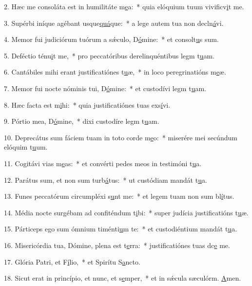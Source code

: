 2. Hæc me consoláta est in humilitáte m\uline{e}a:~* quia elóquium tuum vivificv\uline{i}t me.\par 
3. Supérbi iníque agébant usque\uline{quá}que:~* a lege autem tua non decln\uline{á}vi.\par 
4. Memor fui judiciórum tuórum a sǽculo, D\uline{ó}mine:~* et consolt\uline{u}s sum.\par 
5. Deféctio ténu\uline{i}t me,~* pro peccatóribus derelinquéntibus legm t\uline{u}am.\par 
6. Cantábiles mihi erant justificatiónes t\uline{u}æ,~* in loco peregrinatións m\uline{e}æ.\par 
7. Memor fui nocte nóminis tui, D\uline{ó}mine:~* et custodívi legm t\uline{u}am.\par 
8. Hæc facta est m\uline{i}hi:~* quia justificatiónes tuas exs\uline{í}vi.\par 
9. Pórtio mea, D\uline{ó}mine,~* dixi custodíre legm t\uline{u}am.\par 
10. Deprecátus sum fáciem tuam in toto corde m\uline{e}o:~* miserére mei secúndum elóquim t\uline{u}um.\par 
11. Cogitávi vias m\uline{e}as:~* et convérti pedes meos in testimóni t\uline{u}a.\par 
12. Parátus sum, et non sum turb\uline{á}tus:~* ut custódiam mandát t\uline{u}a.\par 
13. Funes peccatórum circumpléxi s\uline{u}nt me:~* et legem tuam non sum bl\uline{í}tus.\par 
14. Média nocte surgébam ad confiténdum t\uline{i}bi:~* super judícia justificatións t\uline{u}æ.\par 
15. Párticeps ego sum ómnium timénti\uline{u}m te:~* et custodiéntium mandát t\uline{u}a.\par 
16. Misericórdia tua, Dómine, plena est t\uline{e}rra:~* justificatiónes tuas dc\uline{e} me.\par 
17. Glória Patri, et F\uline{í}lio,~* et Spirítu S\uline{a}ncto.\par 
18. Sicut erat in princípio, et nunc, et s\uline{e}mper,~* et in sǽcula sæculórm. \uline{A}men.\par 

